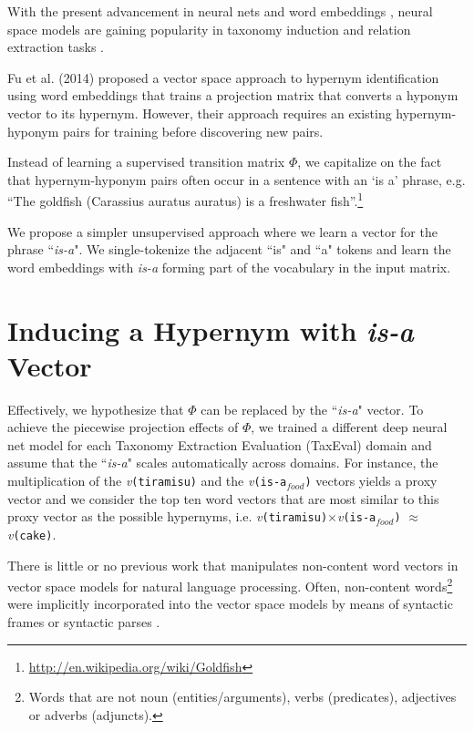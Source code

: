 With the present advancement in neural nets and word embeddings \citep{mikolov2013distributed,pennington2014glove,levy2014linguistic,shazeer2016swivel}, neural space models are gaining popularity in taxonomy induction and relation extraction tasks \citep{saxe2013,fu2014semhierarchies,tan-gupta-vangenabith:2015:SemEval}.

Fu et al. (2014) proposed a vector space approach to hypernym identification using word embeddings that trains a projection matrix that converts a hyponym vector to its hypernym. However, their approach requires an existing hypernym-hyponym pairs for training before discovering new pairs.

Instead of learning a supervised transition matrix $\Phi$, we capitalize on the fact that hypernym-hyponym pairs often occur in a sentence with an ‘is a’ phrase, e.g. “The goldfish (Carassius auratus auratus) is a freshwater fish”.\footnote{\url{http://en.wikipedia.org/wiki/Goldfish}}

We propose a simpler unsupervised approach where we learn a vector for the phrase ``\emph{is-a}". We single-tokenize the adjacent ``is" and ``a" tokens and learn the word embeddings with \emph{is-a} forming part of the vocabulary in the input matrix. 

\section{Inducing a Hypernym with \emph{is-a} Vector}

Effectively, we hypothesize that $\Phi$ can be replaced by the ``\emph{is-a}" vector. To achieve the piecewise projection effects of $\Phi$, we trained a different deep neural net model for each Taxonomy Extraction Evaluation (TaxEval) domain \citep{task17semeval2015} and assume that the ``\emph{is-a}" scales automatically across domains. For instance, the multiplication  of the \emph{v}\texttt{(tiramisu)} and the \emph{v}\texttt{(is-a$_{food}$)} vectors yields a proxy vector and we consider the top ten word vectors that are most similar to this proxy vector as the possible hypernyms, i.e. \emph{v}\texttt{(tiramisu)}$\times$\emph{v}\texttt{(is-a$_{food}$)} $\approx$ \emph{v}\texttt{(cake)}.

There is little or no previous work that manipulates non-content word vectors in vector space models for natural language processing. Often, non-content words\footnote{Words that are not noun (entities/arguments), verbs (predicates), adjectives or adverbs (adjuncts).} were implicitly incorporated into the vector space models by means of syntactic frames or syntactic parses \citep{Sarmento2009}.


